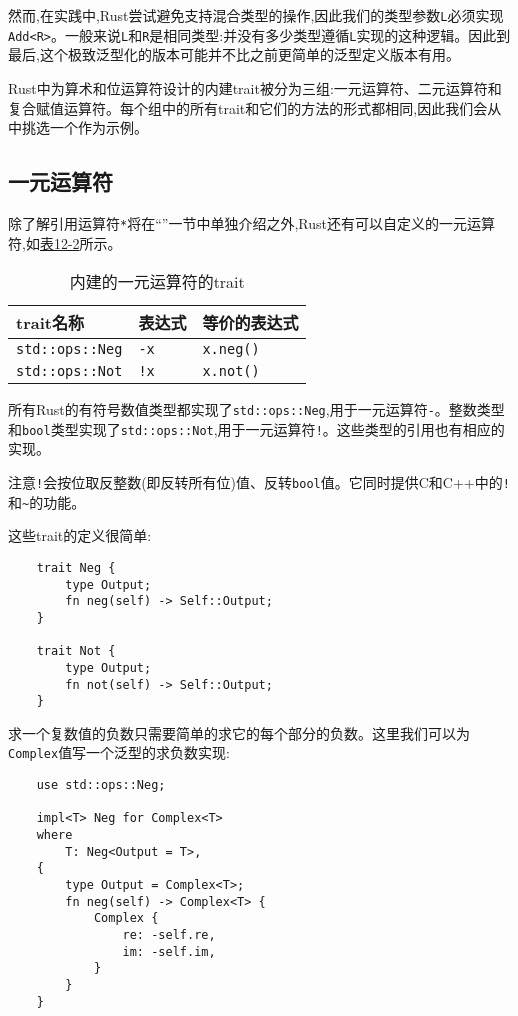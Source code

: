 然而,在实践中,Rust尝试避免支持混合类型的操作,因此我们的类型参数\texttt{L}必须实现\texttt{Add<R>}。一般来说\texttt{L}和\texttt{R}是相同类型:并没有多少类型遵循\texttt{L}实现的这种逻辑。因此到最后,这个极致泛型化的版本可能并不比之前更简单的泛型定义版本有用。

Rust中为算术和位运算符设计的内建trait被分为三组:一元运算符、二元运算符和复合赋值运算符。每个组中的所有trait和它们的方法的形式都相同,因此我们会从中挑选一个作为示例。

\subsection{一元运算符}\label{unop}
除了解引用运算符\texttt{*}将在“”一节中单独介绍之外,Rust还有可以自定义的一元运算符,如\hyperref[t12-2]{表12-2}所示。

\begin{table}[htbp]
    \centering
    \caption{内建的一元运算符的trait}
    \label{t12-2}
    \begin{tabular}{p{}p{}p{}}
        \hline
        \textbf{trait名称}  & \textbf{表达式}   & \textbf{等价的表达式} \\
        \hline
        \texttt{std::ops::Neg}  & \texttt{-x}   & \texttt{x.neg()}  \\
        \rowcolor{tablecolor}
        \texttt{std::ops::Not}  & \texttt{!x}   & \texttt{x.not()}  \\
    \end{tabular}
\end{table}

所有Rust的有符号数值类型都实现了\texttt{std::ops::Neg},用于一元运算符\texttt{-}。整数类型和\texttt{bool}类型实现了\texttt{std::ops::Not},用于一元运算符\texttt{!}。这些类型的引用也有相应的实现。

注意\texttt{!}会按位取反整数(即反转所有位)值、反转\texttt{bool}值。它同时提供C和C++中的\texttt{!}和\texttt{\~{}}的功能。

这些trait的定义很简单:
\begin{verbatim}
    trait Neg {
        type Output;
        fn neg(self) -> Self::Output;
    }

    trait Not {
        type Output;
        fn not(self) -> Self::Output;
    }
\end{verbatim}

求一个复数值的负数只需要简单的求它的每个部分的负数。这里我们可以为\texttt{Complex}值写一个泛型的求负数实现:
\begin{verbatim}
    use std::ops::Neg;

    impl<T> Neg for Complex<T>
    where
        T: Neg<Output = T>,
    {
        type Output = Complex<T>;
        fn neg(self) -> Complex<T> {
            Complex {
                re: -self.re,
                im: -self.im,
            }
        }
    }
\end{verbatim}

